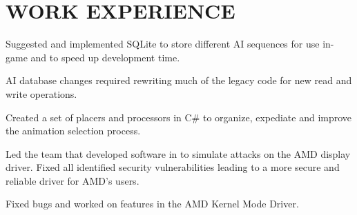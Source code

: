 \documentclass[letterpaper]{deedy-resume-modified} %
\begin{document}
\hfill
%
%
\begin{minipage}[t]{0.66\textwidth} %
\vspace{5pt}

\section{WORK EXPERIENCE}


\vspace{\topsep}
\begin{tightitemize}
\item Suggested and implemented SQLite to store different AI sequences for use in-game and to speed up development time.  
\item AI database changes required rewriting much of the legacy \CPP \hspace{1pt}code for new read and write operations.
\item Created a set of placers and processors in C\# to organize, expediate and improve the animation selection process.
\end{tightitemize}

\sectionspace %



\vspace{\topsep}
\begin{tightitemize}
\vspace{-10pt}
\item Led the team that developed software in \CPP \hspace{1pt} to simulate attacks on the AMD display driver.  Fixed all identified security vulnerabilities leading to a more secure and reliable driver for AMD's users.
\item Fixed bugs and worked on features in the AMD Kernel Mode Driver.
\end{tightitemize}


\end{minipage}
\end{document}
